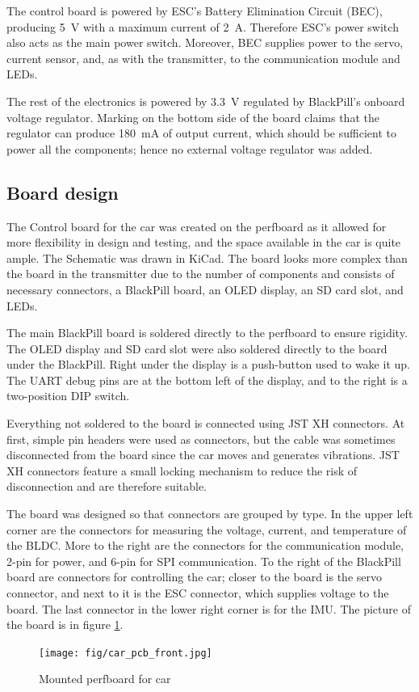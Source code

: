 The control board is powered by ESC's Battery Elimination Circuit (BEC), producing \SI{5}{\V} with a maximum current of \SI{2}{\A}. Therefore ESC's power switch also acts as the main power switch. Moreover, BEC supplies power to the servo, current sensor, and, as with the transmitter, to the communication module and LEDs.

The rest of the electronics is powered by \SI{3.3}{\V} regulated by BlackPill's onboard voltage regulator. Marking on the bottom side of the board claims that the regulator can produce \SI{180}{\mA} of output current, which should be sufficient to power all the components; hence no external voltage regulator was added.

\subsection{Board design}
The Control board for the car was created on the perfboard as it allowed for more flexibility in design and testing, and the space available in the car is quite ample. The Schematic was drawn in KiCad. The board looks more complex than the board in the transmitter due to the number of components and consists of necessary connectors, a BlackPill board, an OLED display, an SD card slot, and LEDs.

The main BlackPill board is soldered directly to the perfboard to ensure rigidity. The OLED display and SD card slot were also soldered directly to the board under the BlackPill. Right under the display is a push-button used to wake it up. The UART debug pins are at the bottom left of the display, and to the right is a two-position DIP switch.

Everything not soldered to the board is connected using JST XH connectors. At first, simple pin headers were used as connectors, but the cable was sometimes disconnected from the board since the car moves and generates vibrations. JST XH connectors feature a small locking mechanism to reduce the risk of disconnection and are therefore suitable.

The board was designed so that connectors are grouped by type. In the upper left corner are the connectors for measuring the voltage, current, and temperature of the BLDC. More to the right are the connectors for the communication module, 2-pin for power, and 6-pin for SPI communication. To the right of the BlackPill board are connectors for controlling the car; closer to the board is the servo connector, and next to it is the ESC connector, which supplies voltage to the board. The last connector in the lower right corner is for the IMU. The picture of the board is in figure \ref{fig:car_pcb}.
\begin{figure}[t]
\centering
\texttt{[image: fig/car\_pcb\_front.jpg]}
\caption{Mounted perfboard for car}
\label{fig:car_pcb}
\end{figure}

